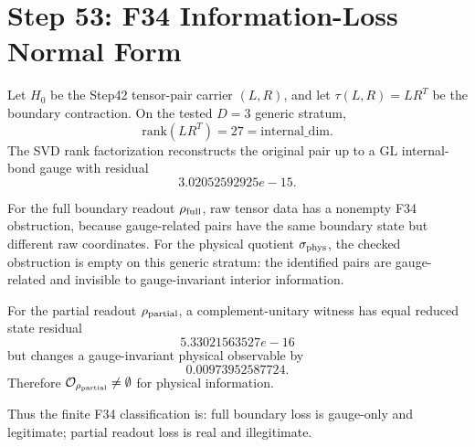 \section*{Step 53: F34 Information-Loss Normal Form}

Let \(H_0\) be the Step42 tensor-pair carrier \((L,R)\), and let
\(\tau(L,R)=LR^T\) be the boundary contraction.  On the tested \(D=3\)
generic stratum,
\[
\mathrm{rank}(LR^T)=27=
\mathrm{internal\_dim}.
\]
The SVD rank factorization reconstructs the original pair up to a
\(\mathrm{GL}\) internal-bond gauge with residual
\[
3.02052592925e-15.
\]

For the full boundary readout \(\rho_{\rm full}\), raw tensor data has a
nonempty F34 obstruction, because gauge-related pairs have the same boundary
state but different raw coordinates.  For the physical quotient
\(\sigma_{\rm phys}\), the checked obstruction is empty on this generic stratum:
the identified pairs are gauge-related and invisible to gauge-invariant
interior information.

For the partial readout \(\rho_{\rm partial}\), a complement-unitary witness
has equal reduced state residual
\[
5.33021563527e-16
\]
but changes a gauge-invariant physical observable by
\[
0.00973952587724.
\]
Therefore \(\mathcal O_{\rho_{\rm partial}}\ne\emptyset\) for physical
information.

Thus the finite F34 classification is: full boundary loss is gauge-only and
legitimate; partial readout loss is real and illegitimate.
